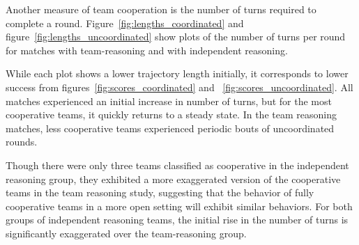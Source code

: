 Another measure of team cooperation is the number of turns required to complete a round. Figure~\ref{fig:lengths_coordinated} and figure~\ref{fig:lengths_uncoordinated} show plots of the number of turns per round for matches with team-reasoning and with independent reasoning.

While each plot shows a lower trajectory length initially, it corresponds to lower success from figures~\ref{fig:scores_coordinated} and ~\ref{fig:scores_uncoordinated}. All matches experienced an initial increase in number of turns, but for the most cooperative teams, it quickly returns to a steady state. In the team reasoning matches, less cooperative teams experienced periodic bouts of uncoordinated rounds.

Though there were only three teams classified as cooperative in the independent reasoning group, they exhibited a more exaggerated version of the cooperative teams in the team reasoning study, suggesting that the behavior of fully cooperative teams in a more open setting will exhibit similar behaviors. For both groups of independent reasoning teams, the initial rise in the number of turns is significantly exaggerated over the team-reasoning group. 


